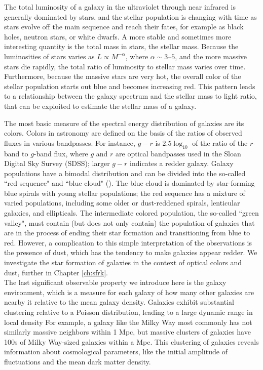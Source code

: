 The total luminosity of a galaxy in the ultraviolet through near
infrared is generally dominated by stars, and the stellar population
is changing with time as stars evolve off the main sequence and reach
their fates, for example as black holes, neutron stars, or white
dwarfs.  A more stable and sometimes more interesting quantity is the
total mass in stars, the stellar mass. Because the luminosities of
stars varies as $L\propto M^{-\alpha}$, where $\alpha \sim 3$--$5$,
and the more massive stars die rapidly, the total ratio of luminosity
to stellar mass varies over time. Furthermore, because the massive
stars are very hot, the overall color of the stellar population starts
out blue and becomes increasing red. This pattern leads to a
relationship between the galaxy spectrum and the stellar mass to light
ratio, that can be exploited to estimate the stellar mass of a galaxy.

The most basic measure of the spectral energy distribution of galaxies
are its colors.  Colors in astronomy are defined on the basis of the
ratios of observed fluxes in various bandpasses. For instance, $g-r$
is $2.5\log_{10}$ of the ratio of the $r$-band to $g$-band flux, where
$g$ and $r$ are optical bandpasses used in the Sloan Digital Sky
Survey (SDSS); larger $g-r$ indicates a redder galaxy.  Galaxy
populations have a bimodal distribution and can be divided into the
so-called ``red sequence" and ``blue cloud"
(\citet{2001AJ....122.1861S, 2003ApJ...594..186B}). The blue cloud is
dominated by star-forming blue spirals with young stellar populations;
the red sequence has a mixture of varied populations, including some
older or dust-reddened spirals, lenticular galaxies, and ellipticals.
The intermediate colored population, the so-called ``green valley",
must contain (but does not only contain) the population of galaxies
that are in the process of ending their star formation and
transitioning from blue to red. However, a complication to this simple
interpretation of the observations is the presence of dust, which has
the tendency to make galaxies appear redder. We investigate the star
formation of galaxies in the context of optical colors and dust,
further in Chapter \ref{ch:sfrk}.\\

The last significant observable property we introduce here is the
galaxy environment, which is a measure for each galaxy of how many
other galaxies are nearby it relative to the mean galaxy density.
Galaxies exhibit substantial clustering relative to a Poisson
distribution, leading to a large dynamic range in local density For
example, a galaxy like the Milky Way most commonly has not similarly
massive neighbors within 1 Mpc, but massive clusters of galaxies have
100s of Milky Way-sized galaxies within a Mpc. This clustering of
galaxies reveals information about cosmological parameters, like the
initial amplitude of fluctuations and the mean dark matter density.

